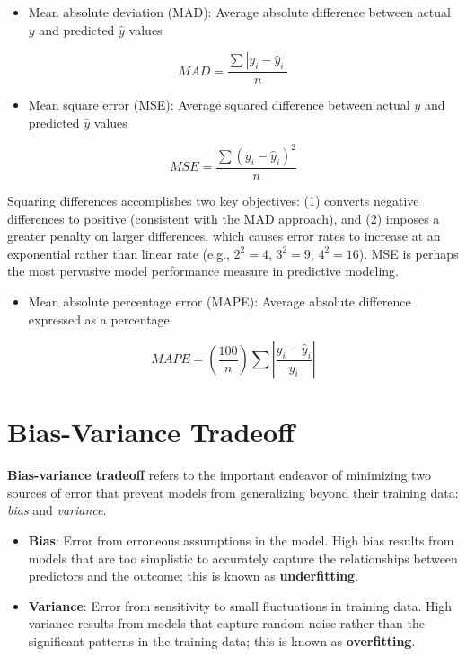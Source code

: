 \documentclass[
]{book}
\providecommand{\tightlist}{%
  \setlength{\itemsep}{0pt}\setlength{\parskip}{0pt}}
\begin{document}
\begin{itemize}
\tightlist
\item
  Mean absolute deviation (MAD): Average absolute difference between actual \(y\) and predicted \(\hat y\) values
\end{itemize}

\[ MAD = \frac{\sum|y_i - \hat y_i|}{n} \]

\begin{itemize}
\tightlist
\item
  Mean square error (MSE): Average squared difference between actual \(y\) and predicted \(\hat y\) values
\end{itemize}

\[ MSE = \frac{\sum(y_i - \hat y_i)^2}{n} \]

Squaring differences accomplishes two key objectives: (1) converts negative differences to positive (consistent with the MAD approach), and (2) imposes a greater penalty on larger differences, which causes error rates to increase at an exponential rather than linear rate (e.g., \(2^2 = 4\), \(3^2 = 9\), \(4^2 = 16\)). MSE is perhaps the most pervasive model performance measure in predictive modeling.

\begin{itemize}
\tightlist
\item
  Mean absolute percentage error (MAPE): Average absolute difference expressed as a percentage
\end{itemize}

\[ MAPE = (\frac{100}{n})\sum|\frac{y_i - \hat y_i}{y_i}| \]

\hypertarget{bias-variance-tradeoff}{%
\section{Bias-Variance Tradeoff}\label{bias-variance-tradeoff}}

\textbf{Bias-variance tradeoff} refers to the important endeavor of minimizing two sources of error that prevent models from generalizing beyond their training data: \emph{bias} and \emph{variance}.

\begin{itemize}
\tightlist
\item
  \textbf{Bias}: Error from erroneous assumptions in the model. High bias results from models that are too simplistic to accurately capture the relationships between predictors and the outcome; this is known as \textbf{underfitting}.
\item
  \textbf{Variance}: Error from sensitivity to small fluctuations in training data. High variance results from models that capture random noise rather than the significant patterns in the training data; this is known as \textbf{overfitting}.
\end{itemize}
\end{document}
